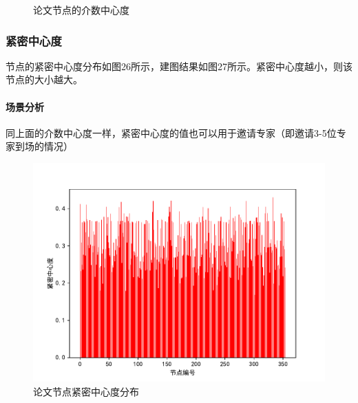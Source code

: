 \documentclass[UTF8, onecolumn, a4paper]{article}
\begin{document}
\begin{center}
\begin{figure}[ht]
\begin{minipage}[b]{0.95\linewidth}
\begin{minipage}[b]{0.47\linewidth}
				\caption{论文节点的介数中心度}
			\end{minipage}
		\end{minipage}
	\end{figure}
\end{center}
\subsubsection{紧密中心度}
    节点的紧密中心度分布如图26所示，建图结果如图27所示。紧密中心度越小，则该节点的大小越大。
    
    \paragraph{场景分析}同上面的介数中心度一样，紧密中心度的值也可以用于邀请专家（即邀请3-5位专家到场的情况）
\begin{center}
	\begin{figure}[ht] %
		\centering %
		\begin{minipage}[b]{0.95\linewidth} %
			\begin{minipage}[b]{0.47\linewidth} %
				\centering
				\includegraphics[width=\linewidth]{../pictures/paper_closeness}
				\caption{论文节点紧密中心度分布}
			\end{minipage}
			\hfill
			\begin{minipage}[b]{0.46\linewidth}
				\centering

\end{minipage}
\end{minipage}
\end{figure}
\end{center}
\end{document}
